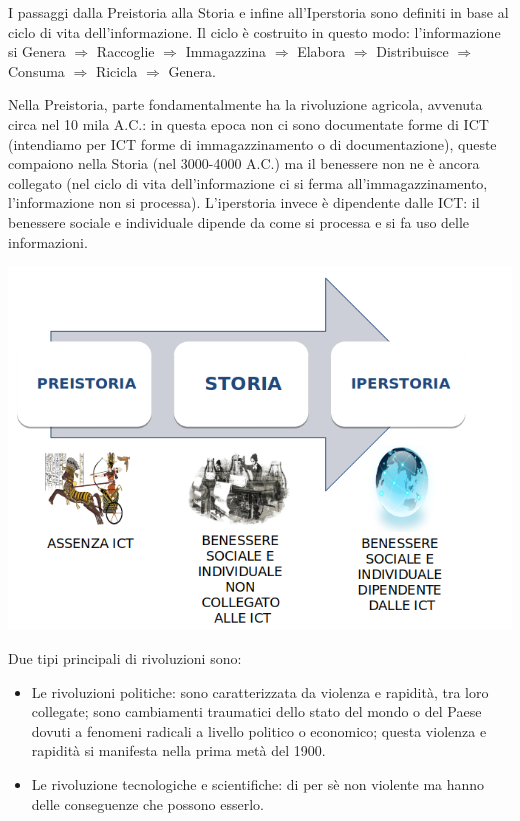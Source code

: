 \documentclass[a4page, 11pt]{article}
\begin{document}
I passaggi dalla Preistoria alla Storia e infine all'Iperstoria sono definiti in base al ciclo di vita dell'informazione.
Il ciclo è costruito in questo modo: l'informazione si Genera $\Rightarrow$ Raccoglie $\Rightarrow$ Immagazzina $\Rightarrow$
Elabora $\Rightarrow$ Distribuisce $\Rightarrow$ Consuma $\Rightarrow$ Ricicla $\Rightarrow$ Genera.

Nella Preistoria, parte fondamentalmente ha la rivoluzione agricola, avvenuta circa nel 10 mila A.C.: in questa epoca non ci sono documentate forme di ICT (intendiamo per ICT forme di immagazzinamento o di documentazione), queste compaiono nella Storia (nel 3000-4000 A.C.) ma il benessere non ne è ancora collegato (nel ciclo di vita dell'informazione ci si ferma all'immagazzinamento, l'informazione non si processa).
L'iperstoria invece è dipendente dalle ICT: il benessere sociale e individuale dipende da come si processa e si fa uso delle informazioni.\newline
\begin{center}
  \includegraphics[scale=0.5]{image1.png}
\end{center}

Due tipi principali di rivoluzioni sono:
\begin{itemize}	 
  \item Le rivoluzioni politiche: sono caratterizzata da violenza e rapidità, tra loro collegate; sono cambiamenti traumatici dello stato del mondo o del Paese dovuti a fenomeni radicali a livello politico o economico; questa violenza e rapidità si manifesta nella prima metà del 1900.
  \item Le rivoluzione tecnologiche e scientifiche: di per sè non violente ma hanno delle conseguenze che possono esserlo.
\end{itemize}
\end{document}
